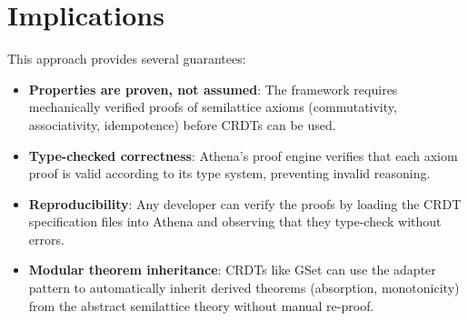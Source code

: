 \section{Implications}

This approach provides several guarantees:

\begin{itemize}
  \item \textbf{Properties are proven, not assumed}: The framework requires mechanically verified proofs of semilattice axioms (commutativity, associativity, idempotence) before CRDTs can be used.
  
  \item \textbf{Type-checked correctness}: Athena's proof engine verifies that each axiom proof is valid according to its type system, preventing invalid reasoning.
  
  \item \textbf{Reproducibility}: Any developer can verify the proofs by loading the CRDT specification files into Athena and observing that they type-check without errors.
  
  \item \textbf{Modular theorem inheritance}: CRDTs like GSet can use the adapter pattern to automatically inherit derived theorems (absorption, monotonicity) from the abstract semilattice theory without manual re-proof.
\end{itemize}

\endinput
